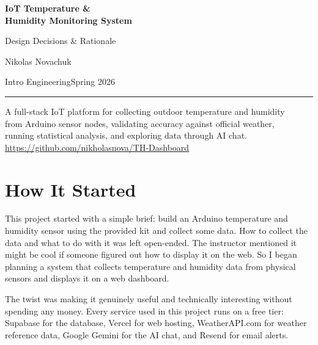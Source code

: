 \documentclass[11pt, letterpaper]{article}
\begin{document}
\begin{titlepage}
\centering
\vspace*{2.5cm}

{\fontsize{30}{36}\selectfont\sffamily\bfseries\color{accent} IoT Temperature \&\\[0.3em] Humidity Monitoring System}

\vspace{1.2cm}

{\Large\sffamily\color{lightgray} Design Decisions \& Rationale}

\vspace{2.5cm}

{\large\sffamily Nikolas Novachuk}

\vspace{0.4cm}

{\sffamily\textcolor{titlegray}{Intro Engineering\enspace\textbullet\enspace Spring 2026}}

\vspace{3.5cm}

{\color{sectionrule}\rule{0.5\textwidth}{0.5pt}}

\vspace{1.2cm}

{\small\color{titlegray}\sffamily
A full-stack IoT platform for collecting outdoor temperature and humidity\\
from Arduino sensor nodes, validating accuracy against official weather,\\
running statistical analysis, and exploring data through AI chat.\\[1.2em]
\url{https://github.com/nikholasnova/TH-Dashboard}
}

\vfill
\end{titlepage}

\tableofcontents
\newpage


\section{How It Started}

This project started with a simple brief: build an Arduino temperature and humidity sensor using the provided kit and collect some data. How to collect the data and what to do with it was left open-ended. The instructor mentioned it might be cool if someone figured out how to display it on the web. So I began planning a system that collects temperature and humidity data from physical sensors and displays it on a web dashboard.

The twist was making it genuinely useful and technically interesting without spending any money. Every service used in this project runs on a free tier: Supabase for the database, Vercel for web hosting, WeatherAPI.com for weather reference data, Google Gemini for the AI chat, and Resend for email alerts.
\end{document}

